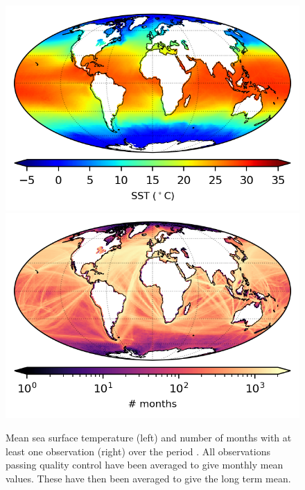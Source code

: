 \begin{figure}[h]
    \includegraphics{resources/observations-sst-mean-map-optimal.png}
    \includegraphics{resources/observations-sst-months-map-optimal.png}
    \caption{Mean sea surface temperature (left) and number of months with at least one observation (right) over the period \datatimerange{}. All observations passing quality control have been averaged to give monthly mean values. These have then been averaged to give the long term mean.\\}
    \label{fig:sst-map}
\end{figure}

\FloatBarrier
